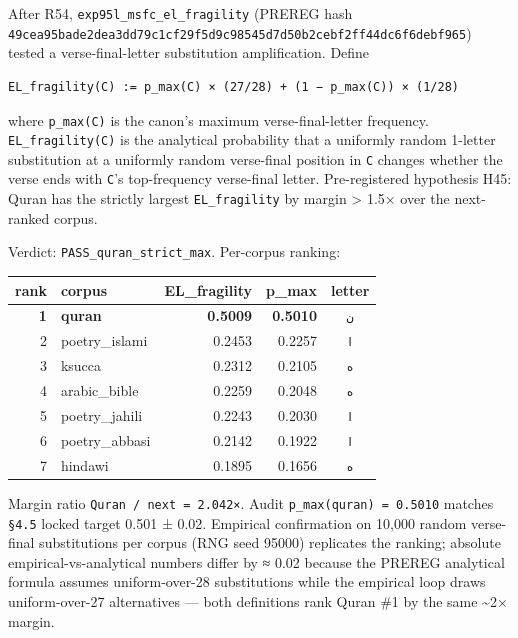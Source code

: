\documentclass[
]{article}
\newcounter{none} %
\begin{document}
After R54, \texttt{exp95l\_msfc\_el\_fragility} (PREREG hash
\texttt{49cea95bade2dea3dd79c1cf29f5d9c98545d7d50b2cebf2ff44dc6f6debf965})
tested a verse-final-letter substitution amplification. Define

\begin{verbatim}
EL_fragility(C) := p_max(C) × (27/28) + (1 − p_max(C)) × (1/28)
\end{verbatim}

where \texttt{p\_max(C)} is the canon's maximum verse-final-letter
frequency. \texttt{EL\_fragility(C)} is the analytical probability that
a uniformly random 1-letter substitution at a uniformly random
verse-final position in \texttt{C} changes whether the verse ends with
\texttt{C}'s top-frequency verse-final letter. Pre-registered hypothesis
H45: Quran has the strictly largest \texttt{EL\_fragility} by margin
\textgreater{} 1.5× over the next-ranked corpus.

Verdict: \texttt{PASS\_quran\_strict\_max}. Per-corpus ranking:

{\def\LTcaptype{none} %
\begin{longtable}[]{@{}rlrrc@{}}
\toprule\noalign{}
rank & corpus & EL\_fragility & p\_max & letter \\
\midrule\noalign{}
\endhead
\bottomrule\noalign{}
\endlastfoot
\textbf{1} & \textbf{quran} & \textbf{0.5009} & \textbf{0.5010} &
\texttt{ن} \\
2 & poetry\_islami & 0.2453 & 0.2257 & \texttt{ا} \\
3 & ksucca & 0.2312 & 0.2105 & \texttt{ه} \\
4 & arabic\_bible & 0.2259 & 0.2048 & \texttt{ه} \\
5 & poetry\_jahili & 0.2243 & 0.2030 & \texttt{ا} \\
6 & poetry\_abbasi & 0.2142 & 0.1922 & \texttt{ا} \\
7 & hindawi & 0.1895 & 0.1656 & \texttt{ه} \\
\end{longtable}
}

Margin ratio \texttt{Quran\ /\ next\ =\ 2.042×}. Audit
\texttt{p\_max(quran)\ =\ 0.5010} matches \texttt{§4.5} locked target
0.501 ± 0.02. Empirical confirmation on 10,000 random verse-final
substitutions per corpus (RNG seed 95000) replicates the ranking;
absolute empirical-vs-analytical numbers differ by ≈ 0.02 because the
PREREG analytical formula assumes uniform-over-28 substitutions while
the empirical loop draws uniform-over-27 alternatives --- both
definitions rank Quran \#1 by the same \textasciitilde2× margin.
\end{document}
